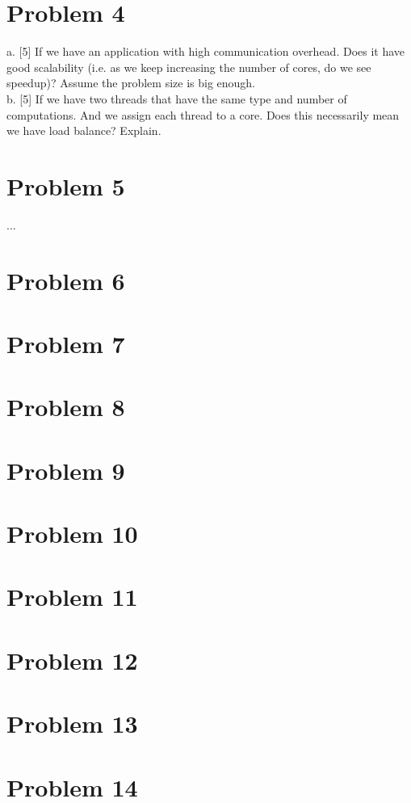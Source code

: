 \documentclass{article}
\begin{document}
\section*{Problem 4}
a. [5] If we have an application with high communication overhead. Does it have good scalability (i.e. as we keep increasing the number of cores, do we see speedup)? Assume the problem size is big enough. \\
b. [5] If we have two threads that have the same type and number of computations. And we assign each thread to a core. Does this necessarily mean we have load balance? Explain.


\section*{Problem 5} ...  %
\section*{Problem 6}
\section*{Problem 7}
\section*{Problem 8}
\section*{Problem 9}
\section*{Problem 10}
\section*{Problem 11}
\section*{Problem 12}
\section*{Problem 13}
\section*{Problem 14}
\end{document}
